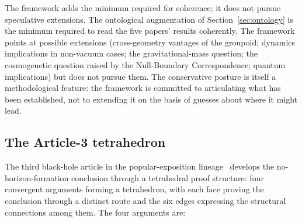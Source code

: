 \documentclass[11pt,a4paper]{article}
\theoremstyle{definition}
\begin{document}
The framework adds the minimum required for coherence; it does not pursue speculative extensions. The ontological augmentation of Section~\ref{sec:ontology} is the minimum required to read the five papers' results coherently. The framework points at possible extensions (cross-geometry vantages of the groupoid; dynamics implications in non-vacuum cases; the gravitational-mass question; the cosmogenetic question raised by the Null-Boundary Correspondence; quantum implications) but does not pursue them. The conservative posture is itself a methodological feature: the framework is committed to articulating what has been established, not to extending it on the basis of guesses about where it might lead.

\subsection{The Article-3 tetrahedron}\label{sec:tetrahedron}

The third black-hole article in the popular-exposition lineage~\cite{JanzenArticle3} develops the no-horizon-formation conclusion through a tetrahedral proof structure: four convergent arguments forming a tetrahedron, with each face proving the conclusion through a distinct route and the six edges expressing the structural connections among them. The four arguments are:
\end{document}
